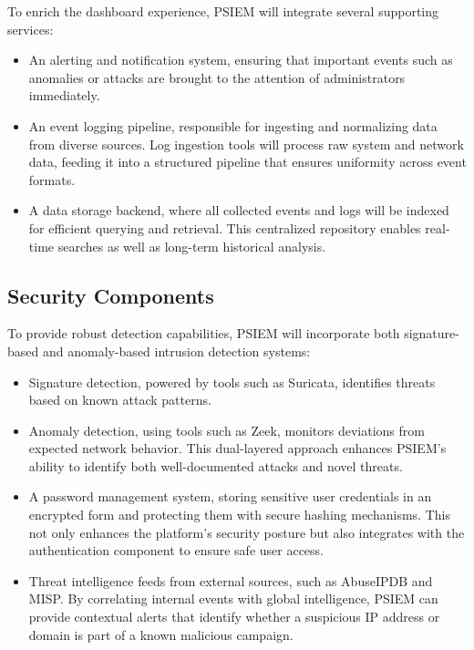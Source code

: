 To enrich the dashboard experience, PSIEM will integrate several supporting services:

\begin{itemize}
    \item An alerting and notification system, ensuring that important events such as anomalies or attacks are brought to the attention of administrators immediately.
    
    \item An event logging pipeline, responsible for ingesting and normalizing data from diverse sources. Log ingestion tools will process raw system and network data, feeding it into a structured pipeline that ensures uniformity across event formats.
    
    \item A data storage backend, where all collected events and logs will be indexed for efficient querying and retrieval. This centralized repository enables real-time searches as well as long-term historical analysis.
\end{itemize}

\subsection{Security Components}

To provide robust detection capabilities, PSIEM will incorporate both signature-based and anomaly-based intrusion detection systems:

\begin{itemize}
    \item Signature detection, powered by tools such as Suricata, identifies threats based on known attack patterns.
    
    \item Anomaly detection, using tools such as Zeek, monitors deviations from expected network behavior. This dual-layered approach enhances PSIEM's ability to identify both well-documented attacks and novel threats.
    
    \item A password management system, storing sensitive user credentials in an encrypted form and protecting them with secure hashing mechanisms. This not only enhances the platform's security posture but also integrates with the authentication component to ensure safe user access.
    
    \item Threat intelligence feeds from external sources, such as AbuseIPDB and MISP. By correlating internal events with global intelligence, PSIEM can provide contextual alerts that identify whether a suspicious IP address or domain is part of a known malicious campaign.
\end{itemize}


